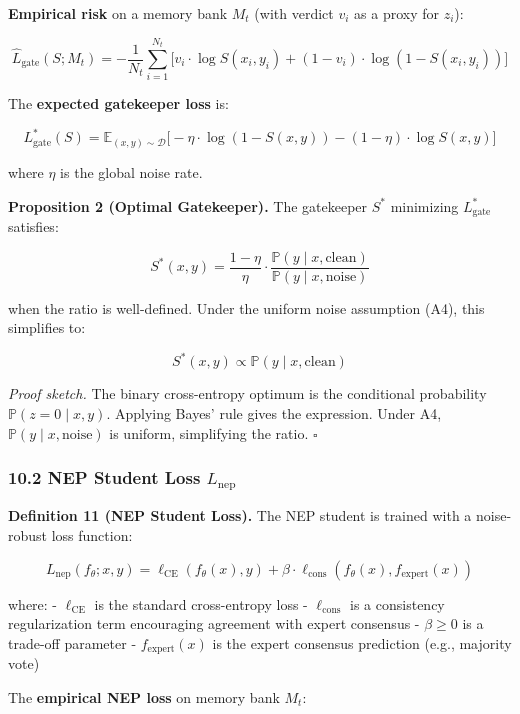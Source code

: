 \documentclass[
  12pt,
]{article}
\begin{document}
\textbf{Empirical risk} on a memory bank \(M_t\) (with verdict \(v_i\)
as a proxy for \(z_i\)):

\[\hat{L}_{\text{gate}}(S; M_t) = -\frac{1}{N_t} \sum_{i=1}^{N_t} \bigl[ v_i \cdot \log S(x_i, y_i) + (1-v_i) \cdot \log(1 - S(x_i, y_i)) \bigr]\]

The \textbf{expected gatekeeper loss} is:

\[L_{\text{gate}}^*(S) = \mathbb{E}_{(x,y) \sim \mathcal{D}}\bigl[ -\eta \cdot \log(1 - S(x,y)) - (1-\eta) \cdot \log S(x,y) \bigr]\]

where \(\eta\) is the global noise rate.

\textbf{Proposition 2 (Optimal Gatekeeper).} The gatekeeper \(S^*\)
minimizing \(L_{\text{gate}}^*\) satisfies:

\[S^*(x, y) = \frac{1-\eta}{\eta} \cdot \frac{\mathbb{P}(y \mid x, \text{clean})}{\mathbb{P}(y \mid x, \text{noise})}\]

when the ratio is well-defined. Under the uniform noise assumption (A4),
this simplifies to:

\[S^*(x, y) \propto \mathbb{P}(y \mid x, \text{clean})\]

\emph{Proof sketch.} The binary cross-entropy optimum is the conditional
probability \(\mathbb{P}(z=0 \mid x, y)\). Applying Bayes' rule gives
the expression. Under A4, \(\mathbb{P}(y \mid x, \text{noise})\) is
uniform, simplifying the ratio. \(\square\)

\subsubsection{\texorpdfstring{10.2 NEP Student Loss
\(L_{\text{nep}}\)}{10.2 NEP Student Loss L\_\{\textbackslash text\{nep\}\}}}\label{nep-student-loss-l_textnep}

\textbf{Definition 11 (NEP Student Loss).} The NEP student is trained
with a noise-robust loss function:

\[L_{\text{nep}}(f_\theta; x, y) = \ell_{\text{CE}}(f_\theta(x), y) + \beta \cdot \ell_{\text{cons}}(f_\theta(x), f_{\text{expert}}(x))\]

where: - \(\ell_{\text{CE}}\) is the standard cross-entropy loss -
\(\ell_{\text{cons}}\) is a consistency regularization term encouraging
agreement with expert consensus - \(\beta \geq 0\) is a trade-off
parameter - \(f_{\text{expert}}(x)\) is the expert consensus prediction
(e.g., majority vote)

The \textbf{empirical NEP loss} on memory bank \(M_t\):
\end{document}

